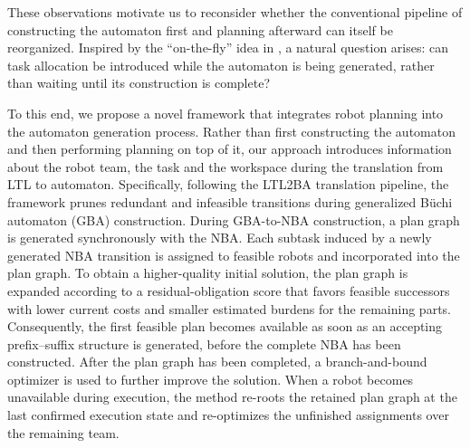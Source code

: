 \documentclass[lettersize,journal]{IEEEtran}
\theoremstyle{italiclemma}
\theoremstyle{italiclemma}
\theoremstyle{definition}
\begin{document}

These observations motivate us to reconsider whether the conventional pipeline of constructing the automaton first and planning afterward can itself be reorganized.
Inspired by the ``on-the-fly'' idea in \cite{Gastin2001FastLT}, a natural question arises: can task allocation be introduced while the automaton is being generated, rather than waiting until its construction is complete?
 
To this end, we propose a novel framework that integrates robot planning into the automaton generation process. Rather than first constructing the automaton and then performing planning on top of it, our approach introduces information about the robot team, the task and the workspace during the translation from LTL to automaton. Specifically, following the LTL2BA\cite{Gastin2001FastLT} translation pipeline, the framework prunes redundant and infeasible transitions during generalized Büchi automaton (GBA) construction. 
During GBA-to-NBA construction, a plan graph is generated synchronously with the NBA. Each subtask induced by a newly generated NBA transition is  assigned to feasible robots and incorporated into the plan graph. To obtain a higher-quality initial solution, the plan graph is expanded according to a residual-obligation score that favors feasible successors with lower current costs and smaller estimated burdens for the remaining parts. Consequently, the first feasible plan becomes available as soon as an accepting prefix--suffix structure is generated, before the complete NBA has been constructed. After the plan graph has been completed, a branch-and-bound optimizer is used to further improve the solution.  When a robot becomes unavailable during execution, the method re-roots the retained plan graph at the last confirmed execution state and re-optimizes the unfinished assignments over the remaining team. 
\end{document}
